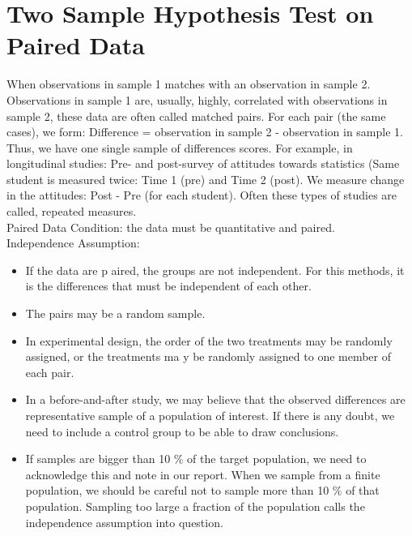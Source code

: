 \section{Two Sample Hypothesis Test on Paired Data}

When observations in sample 1 matches with an observation in sample 2. Observations in sample 1 are, usually, highly, correlated with observations in sample 2, these data are often called matched pairs. For each pair (the same cases), we form: Difference = observation in sample 2 - observation in sample 1. Thus, we have one single sample of differences scores. For example, in longitudinal studies: Pre- and post-survey of attitudes towards statistics (Same student is measured twice: Time 1 (pre) and Time 2 (post). We measure change in the attitudes: Post - Pre (for each student). Often these types of studies are called, repeated measures.\\

Paired Data Condition: the data must be quantitative and paired.\\

Independence Assumption:
\begin{itemize}
	\item If the data are p aired, the groups are not independent. For this methods, it is the differences that must be independent of each other.
	\item The pairs may be a random sample.
	\item In experimental design, the order of the two treatments may be randomly assigned, or the treatments ma y be randomly assigned to one member of each pair.
	\item In a before-and-after study, we may believe that the observed differences are representative sample of a population of interest. If there is any doubt, we need to include a control group to be able to draw conclusions.
	\item If samples are bigger than 10 \% of the target population, we need to acknowledge this and note in our report. When we sample from a ﬁnite population, we should be careful not to sample more than 10 \% of that population. Sampling too large a fraction of the population calls the independence assumption into question.
\end{itemize}

